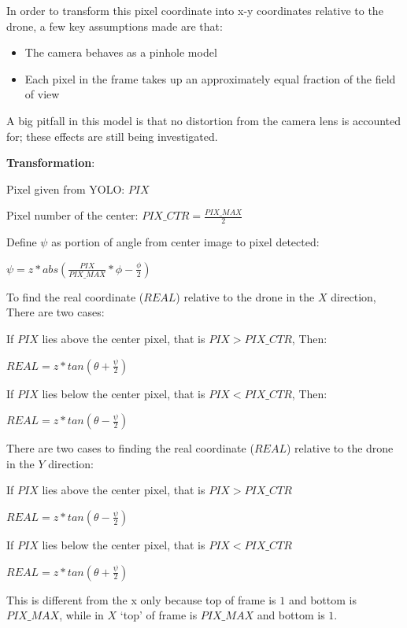 \documentclass[12pt,letterpaper]{article}
\newcommand\tab[1][1cm]{\hspace*{#1}}
\begin{document}
			\begin{spacing}{.2}
			In order to transform this pixel coordinate into x-y coordinates relative to the drone, a few key assumptions made are that:

				\begin{itemize}
					\item The camera behaves as a pinhole model
					\item Each pixel in the frame takes up an approximately equal fraction of the field of view
				\end{itemize}

			A big pitfall in this model is that no distortion from the camera lens is accounted for; these effects are still being investigated.

			\pagebreak
				\textbf{Transformation}:

				Pixel given from YOLO: $PIX$

				Pixel number of the center: $PIX\_CTR = \frac{PIX\_MAX}{2}$

				Define $\psi$ as portion of angle from center image to pixel detected:

				\begin{center}
					$\psi = z * abs(\frac{PIX}{PIX\_MAX} * \phi - \frac{\phi}{2})$
				\end{center}

				To find the real coordinate ($REAL$) relative to the drone in the $X$ direction, There are two cases:

						\tab If $PIX$ lies above the center pixel, that is $PIX > PIX\_CTR$, Then:
						\begin{center}
							$REAL = z * tan(\theta + \frac{\psi}{2})$
						\end{center}
						\tab If $PIX$ lies below the center pixel, that is $PIX < PIX\_CTR$, Then:
						\begin{center}
							$REAL = z * tan(\theta - \frac{\psi}{2})$
						\end{center}
				There are two cases to finding the real coordinate ($REAL$) relative to the drone in the $Y$ direction:

						\tab If $PIX$ lies above the center pixel, that is $PIX > PIX\_CTR$
						\begin{center}
							$REAL = z * tan(\theta - \frac{\psi}{2})$
						\end{center}
						\tab If $PIX$ lies below the center pixel, that is $PIX < PIX\_CTR$
						\begin{center}
							$REAL = z * tan(\theta + \frac{\psi}{2})$
						\end{center}
				This is different from the x only because top of frame is $1$ and bottom is $PIX\_MAX$, while in $X$ `top' of frame is $PIX\_MAX$ and bottom is $1$.
			\end{spacing}
\end{document}
